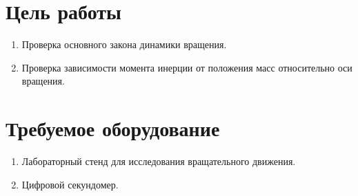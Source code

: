 \documentclass[11pt]{article}
\author{АВТОР}
\date{\today}
\title{}
\begin{document}
\tableofcontents
\pagebreak
\large
\section{Цель работы}
\begin{enumerate}
	\item Проверка основного закона динамики вращения.
	\item Проверка зависимости момента инерции от положения масс относительно
	оси вращения.
\end{enumerate}
\section{Требуемое оборудование}
\begin{enumerate}
	\item Лабораторный стенд для исследования вращательного движения.
	\item Цифровой секундомер.
\end{enumerate}
\end{document}
